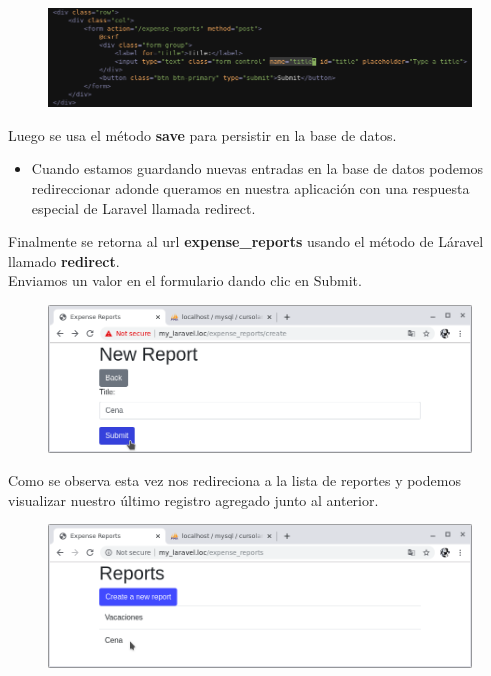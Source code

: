 \documentclass{article}
\begin{document}
\begin{figure}[h!]
  \centering
  \includegraphics[scale=0.5]{./Pictures/066_name_title.png}
\end{figure}

Luego se usa el método \textbf{save} para persistir en la base de datos.

\begin{itemize}
  \item Cuando estamos guardando nuevas entradas en la base de datos podemos
    redireccionar adonde queramos en nuestra aplicación con una respuesta
    especial de Laravel llamada redirect.
\end{itemize}

Finalmente se retorna al url \textbf{expense\_reports} usando el método de
Láravel llamado \textbf{redirect}.\\

Enviamos un valor en el formulario dando clic en Submit.

\begin{figure}[h!]
  \centering
  \includegraphics[scale=0.5]{./Pictures/064_submit_cena.png}
\end{figure}

Como se observa esta vez nos redireciona a la lista de reportes y podemos
visualizar nuestro último registro agregado junto al anterior.\\

\begin{figure}[h!]
  \centering
  \includegraphics[scale=0.5]{./Pictures/065_store_ok.png}
\end{figure}
\end{document}
